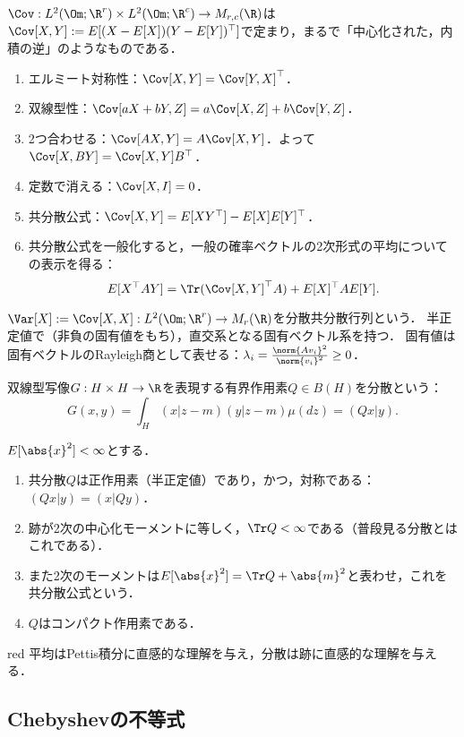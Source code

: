 \documentclass[uplatex,dvipdfmx]{jsreport}
\begin{document}
$\Cov:L^2(\Om;\R^r)\times L^2(\Om;\R^c)\to M_{r,c}(\R)$は$\Cov[X,Y]:=E[(X-E[X])(Y-E[Y])^\top]$で定まり，まるで「中心化された，内積の逆」のようなものである．
\begin{enumerate}
    \item エルミート対称性：$\Cov[X,Y]=\Cov[Y,X]^\top$．
    \item 双線型性：$\Cov[aX+bY,Z]=a\Cov[X,Z]+b\Cov[Y,Z]$．
    \item 2つ合わせる：$\Cov[AX,Y]=A\Cov[X,Y]$．よって$\Cov[X,BY]=\Cov[X,Y]B^\top$．
    \item 定数で消える：$\Cov[X,I]=0$．
    \item 共分散公式：$\Cov[X,Y]=E[XY^\top]-E[X]E[Y]^\top$．
    \item 共分散公式を一般化すると，一般の確率ベクトルの2次形式の平均についての表示を得る：
    \[E[X^\top AY]=\Tr(\Cov[X,Y]^\top A)+E[X]^\top AE[Y].\]
\end{enumerate}

$\Var[X]:=\Cov[X,X]:L^2(\Om;\R^r)\to M_r(\R)$を分散共分散行列という．
半正定値で（非負の固有値をもち），直交系となる固有ベクトル系を持つ．
固有値は固有ベクトルのRayleigh商として表せる：$\lambda_i=\frac{\norm{Av_i}^2}{\norm{v_i}^2}\ge0$．

\begin{definition}
    双線型写像$G:H\times H\to\R$を表現する有界作用素$Q\in B(H)$を分散という：
    \[G(x,y)=\int_H(x|z-m)(y|z-m)\mu(dz)=(Qx|y).\]
\end{definition}
\begin{proposition}
    $E[\abs{x}^2]<\infty$とする．
    \begin{enumerate}
        \item 共分散$Q$は正作用素（半正定値）であり，かつ，対称である：$(Qx|y)=(x|Qy)$．
        \item 跡が2次の中心化モーメントに等しく，$\Tr Q<\infty$である（普段見る分散とはこれである）．
        \item また2次のモーメントは$E[\abs{x}^2]=\Tr Q+\abs{m}^2$と表わせ，これを共分散公式という．
        \item $Q$はコンパクト作用素である．
    \end{enumerate}
\end{proposition}

\begin{tbox}{red}{}
    平均はPettis積分に直感的な理解を与え，分散は跡に直感的な理解を与える．
\end{tbox}

\subsection{Chebyshevの不等式}
\end{document}
